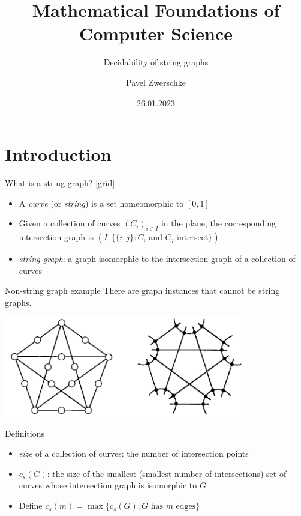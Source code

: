 \documentclass[10pt,aspectratio=169]{beamer}
\title{Mathematical Foundations of Computer Science}
\subtitle{Decidability of string graphs}
\date{26.01.2023}
\author{Pavel Zwerschke}
\institute{Radboud University Nijmegen}
\theoremstyle{plain}
\newcommand{\set}[1]{\{#1\}}
\begin{document}
\maketitle

\section{Introduction}

\begin{frame}{What is a string graph? \cite{schaefer01}}
    [grid]
    \begin{itemize}
        \item A \textit{curve} (or \textit{string}) is a set homeomorphic to \([0,1]\)
        \item Given a collection of curves \((C_i)_{i \in I}\) in the plane, the corresponding intersection graph is \( (I, \set{\set{i, j} : C_i \text{ and } C_j \text{ intersect}}) \)
        \item \textit{string graph}: a graph isomorphic to the intersection graph of a collection of curves 
    \end{itemize}
\end{frame}

\begin{frame}{Non-string graph example \cite{sinden66}}
    There are graph instances that cannot be string graphs.

    \begin{center}
        \includegraphics[width=0.8\textwidth]{images/figure-0.png}
    \end{center}
\end{frame}

\begin{frame}{Definitions}
    \begin{itemize}
        \item \textit{size} of a collection of curves: the number of intersection points
        \item \(c_s(G)\): the size of the smallest (smallest number of intersections) set of curves whose intersection graph is isomorphic to \(G\)
        \item Define \(c_s(m) = \max\set{c_s(G) : G \text{ has } m \text{ edges}}\)
    \end{itemize}
\end{frame}
\end{document}
